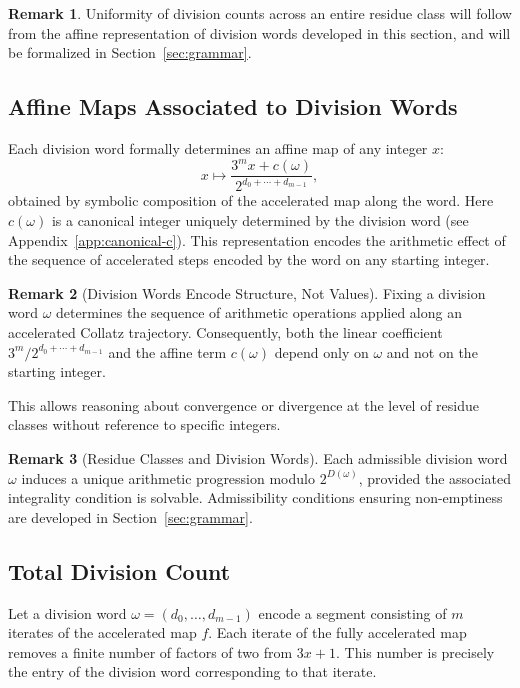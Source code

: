 \documentclass[12pt, oneside]{article}   	%
\numberwithin{equation}{section}          %
\theoremstyle{definition}
\newtheorem*{remark}{Remark}
\begin{document}
\begin{remark}
Uniformity of division counts across an entire residue class will follow
from the affine representation of division words developed in this section,
and will be formalized in Section~\ref{sec:grammar}.
\end{remark}


\subsection{Affine Maps Associated to Division Words}
Each division word formally determines an affine map of any integer $x$:
\begin{equation}
\label{eq:linear-affine-map-m}
x \longmapsto \frac{3^m x + c(\omega)}{2^{d_0+\cdots+d_{m-1}}},
\end{equation}
obtained by symbolic composition of the accelerated map along the word. Here
$c(\omega)$ is a canonical integer uniquely determined by the division word (see
Appendix~\ref{app:canonical-c}). This representation encodes the arithmetic effect
of the sequence of accelerated steps encoded by the word on any starting integer.

\begin{remark}[Division Words Encode Structure, Not Values]
Fixing a division word $\omega$ determines the sequence of arithmetic
operations applied along an accelerated Collatz trajectory. Consequently,
both the linear coefficient $3^m/2^{d_0+\cdots+d_{m-1}}$ and the affine term
$c(\omega)$ depend only on $\omega$ and not on the starting integer.

This allows reasoning about convergence or divergence at the level of
residue classes without reference to specific integers.
\end{remark}

\begin{remark}[Residue Classes and Division Words]
Each admissible division word $\omega$ induces a unique arithmetic progression
modulo $2^{D(\omega)}$, provided the associated integrality condition is solvable.
Admissibility conditions ensuring non-emptiness are developed in
Section~\ref{sec:grammar}.
\end{remark}


\subsection{Total Division Count}

Let a division word $\omega = (d_0, \dots, d_{m-1})$ encode a segment consisting of $m$
iterates of the accelerated map $f$. Each iterate of the fully accelerated map removes
a finite number of factors of two from $3x+1$. This number is precisely the entry of
the division word corresponding to that iterate.
\end{document}
